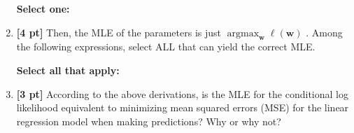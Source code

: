 \documentclass[12pt]{article}
\renewcommand{\circle}{\tikz\draw[black] (0,0) circle (1ex);}
\newcommand{\argmax}{\mathop{\mathrm{argmax}}}
\begin{document}
\begin{enumerate}
    \textbf{Select one:}
    
    
    \item \textbf{[4 pt]} Then, the MLE of the parameters is just  $\argmax_{\mathbf{w}} \ell(\mathbf{w})$ . Among the following expressions, select ALL that can yield the correct MLE. 

    \textbf{Select all that apply:}
    
    
    \clearpage
    
    \item \textbf{[3 pt]} According to the above derivations, is the MLE for the conditional log likelihood equivalent to minimizing mean squared errors (MSE) for the linear regression model when making predictions? Why or why not? 


\end{enumerate}
\end{document}

